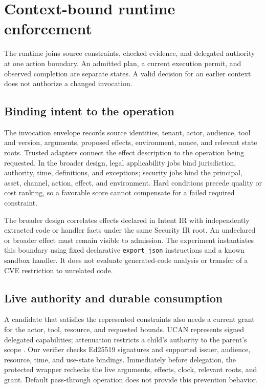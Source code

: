 \section{Context-bound runtime enforcement}
\label{sec:method}

The runtime joins source constraints, checked evidence, and delegated authority at one action boundary. An admitted plan, a current execution permit, and observed completion are separate states. A valid decision for an earlier context does not authorize a changed invocation.

\subsection{Binding intent to the operation}

The invocation envelope records source identities, tenant, actor, audience, tool and version, arguments, proposed effects, environment, nonce, and relevant state roots. Trusted adapters connect the effect description to the operation being requested. In the broader design, legal applicability jobs bind jurisdiction, authority, time, definitions, and exceptions; security jobs bind the principal, asset, channel, action, effect, and environment. Hard conditions precede quality or cost ranking, so a favorable score cannot compensate for a failed required constraint.

The broader design correlates effects declared in Intent IR with independently extracted code or handler facts under the same Security IR root. An undeclared or broader effect must remain visible to admission. The experiment instantiates this boundary using fixed declarative \texttt{export\_json} instructions and a known sandbox handler. It does not evaluate generated-code analysis or transfer of a CVE restriction to unrelated code.

\subsection{Live authority and durable consumption}

A candidate that satisfies the represented constraints also needs a current grant for the actor, tool, resource, and requested bounds. UCAN represents signed delegated capabilities; attenuation restricts a child's authority to the parent's scope \citep{ucan}. Our verifier checks Ed25519 signatures and supported issuer, audience, resource, time, and use-state bindings. Immediately before delegation, the protected wrapper rechecks the live arguments, effects, clock, relevant roots, and grant. Default pass-through operation does not provide this prevention behavior.

